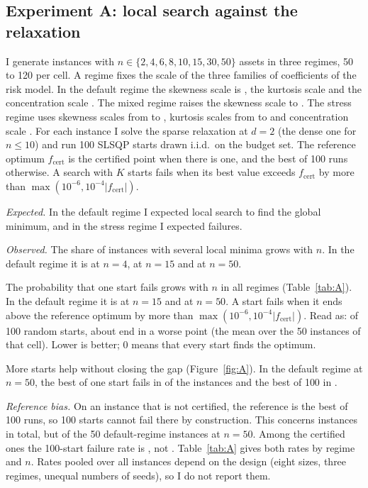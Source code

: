 \documentclass[11pt,a4paper]{article}
\begin{document}
\subsection{Experiment A: local search against the relaxation}
I generate \aN{} instances with $n\in\{2,4,6,8,10,15,30,50\}$ assets in three regimes, 50 to 120 per cell.
A regime fixes the scale of the three families of coefficients of the risk model.
In the default regime the skewness scale is \rgSkewDef{}, the kurtosis scale \rgKurt{} and the concentration scale \rgImpDef{}.
The mixed regime raises the skewness scale to \rgSkewMix{}.
The stress regime uses skewness scales from \rgSkewStrLo{} to \rgSkewStrHi{}, kurtosis scales from \rgKurtStrLo{} to \rgKurtStrHi{} and concentration scale \rgImpStr{}.
For each instance I solve the sparse relaxation at $d=2$ (the dense one for $n\le10$) and run 100 SLSQP starts drawn i.i.d.\ on the budget set.
The reference optimum $f_{\mathrm{cert}}$ is the certified point when there is one, and the best of 100 runs otherwise.
A search with $K$ starts fails when its best value exceeds $f_{\mathrm{cert}}$ by more than $\max(10^{-6},10^{-4}|f_{\mathrm{cert}}|)$.

\emph{Expected.}
In the default regime I expected local search to find the global minimum, and in the stress regime I expected failures.

\emph{Observed.}
The share of instances with several local minima grows with $n$.
In the default regime it is \aMultiDefFour{} at $n=4$, \aMultiDefFifteen{} at $n=15$ and \aMultiDefFifty{} at $n=50$.

The probability that one start fails grows with $n$ in all regimes (Table~\ref{tab:A}).
In the default regime it is \aPfDefFifteen{} at $n=15$ and \aPfDefFifty{} at $n=50$.
A start fails when it ends above the reference optimum by more than $\max(10^{-6},10^{-4}|f_{\mathrm{cert}}|)$.
Read \aPfDefFifty{} as: of 100 random starts, about \aPfDefFiftyHundred{} end in a worse point (the mean over the 50 instances of that cell).
Lower is better; 0 means that every start finds the optimum.

More starts help without closing the gap (Figure~\ref{fig:A}).
In the default regime at $n=50$, the best of one start fails in \aFOneDefFifty{} of the instances and the best of 100 in \aFHundredDefFifty{}.

\emph{Reference bias.}
On an instance that is not certified, the reference is the best of 100 runs, so 100 starts cannot fail there by construction.
This concerns \aUncert{} instances in total, but \aUncertDefFifty{} of the 50 default-regime instances at $n=50$.
Among the certified ones the 100-start failure rate is \aFHundredCertDefFifty{}, not \aFHundredDefFifty{}.
Table~\ref{tab:A} gives both rates by regime and $n$.
Rates pooled over all instances depend on the design (eight sizes, three regimes, unequal numbers of seeds), so I do not report them.
\end{document}
